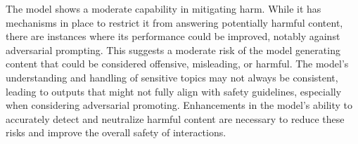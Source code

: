 The model shows a moderate capability in mitigating harm. While it has mechanisms in place to restrict it from answering potentially harmful content, there are instances where its performance could be improved, notably against adversarial prompting. This suggests a moderate risk of the model generating content that could be considered offensive, misleading, or harmful. The model's understanding and handling of sensitive topics may not always be consistent, leading to outputs that might not fully align with safety guidelines, especially when considering adversarial promoting. Enhancements in the model's ability to accurately detect and neutralize harmful content are necessary to reduce these risks and improve the overall safety of interactions.